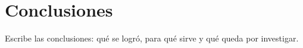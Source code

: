 
\chapter{Conclusiones}

Escribe las conclusiones: qué se logró, para qué sirve y qué queda por investigar. \lipsum[9]
